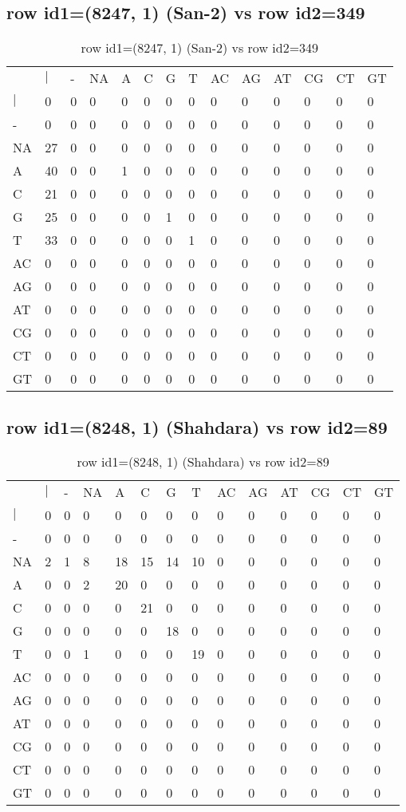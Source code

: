 \subsection{row id1=(8247, 1) (San-2) vs row id2=349}
\begin{center}
\begin{longtable}{|l|l|l|l|l|l|l|l|l|l|l|l|l|l|}
\caption{row id1=(8247, 1) (San-2) vs row id2=349} \label{table_dm384}\\
\hline
\\
\hline
&$|$&-&NA&A&C&G&T&AC&AG&AT&CG&CT&GT\\
$|$&0&0&0&0&0&0&0&0&0&0&0&0&0\\
-&0&0&0&0&0&0&0&0&0&0&0&0&0\\
NA&27&0&0&0&0&0&0&0&0&0&0&0&0\\
A&40&0&0&1&0&0&0&0&0&0&0&0&0\\
C&21&0&0&0&0&0&0&0&0&0&0&0&0\\
G&25&0&0&0&0&1&0&0&0&0&0&0&0\\
T&33&0&0&0&0&0&1&0&0&0&0&0&0\\
AC&0&0&0&0&0&0&0&0&0&0&0&0&0\\
AG&0&0&0&0&0&0&0&0&0&0&0&0&0\\
AT&0&0&0&0&0&0&0&0&0&0&0&0&0\\
CG&0&0&0&0&0&0&0&0&0&0&0&0&0\\
CT&0&0&0&0&0&0&0&0&0&0&0&0&0\\
GT&0&0&0&0&0&0&0&0&0&0&0&0&0\\
\hline
\end{longtable}
\end{center}

\subsection{row id1=(8248, 1) (Shahdara) vs row id2=89}
\begin{center}
\begin{longtable}{|l|l|l|l|l|l|l|l|l|l|l|l|l|l|}
\caption{row id1=(8248, 1) (Shahdara) vs row id2=89} \label{table_dm386}\\
\hline
\\
\hline
&$|$&-&NA&A&C&G&T&AC&AG&AT&CG&CT&GT\\
$|$&0&0&0&0&0&0&0&0&0&0&0&0&0\\
-&0&0&0&0&0&0&0&0&0&0&0&0&0\\
NA&2&1&8&18&15&14&10&0&0&0&0&0&0\\
A&0&0&2&20&0&0&0&0&0&0&0&0&0\\
C&0&0&0&0&21&0&0&0&0&0&0&0&0\\
G&0&0&0&0&0&18&0&0&0&0&0&0&0\\
T&0&0&1&0&0&0&19&0&0&0&0&0&0\\
AC&0&0&0&0&0&0&0&0&0&0&0&0&0\\
AG&0&0&0&0&0&0&0&0&0&0&0&0&0\\
AT&0&0&0&0&0&0&0&0&0&0&0&0&0\\
CG&0&0&0&0&0&0&0&0&0&0&0&0&0\\
CT&0&0&0&0&0&0&0&0&0&0&0&0&0\\
GT&0&0&0&0&0&0&0&0&0&0&0&0&0\\
\hline
\end{longtable}
\end{center}

